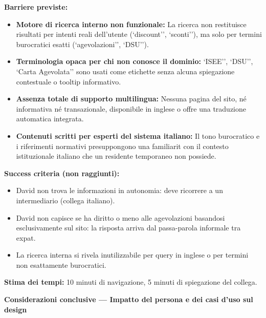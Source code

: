 \documentclass[11pt,a4paper]{article}
\begin{document}
\begin{tcolorbox}[colback=backgroundColor,colframe=borderColor,arc=2mm]
{    \textbf{Barriere previste:}
    \begin{itemize}
        \item \textbf{Motore di ricerca interno non funzionale:} La ricerca non restituisce risultati per intenti reali dell'utente (`discount'', `sconti''), ma solo per termini burocratici esatti (`agevolazioni'', `DSU'').
        \item \textbf{Terminologia opaca per chi non conosce il dominio:} `ISEE'', `DSU'', `Carta Agevolata'' sono usati come etichette senza alcuna spiegazione contestuale o tooltip informativo.
        \item \textbf{Assenza totale di supporto multilingua:} Nessuna pagina del sito, n\'e informativa n\'e transazionale, \e disponibile in inglese o offre una traduzione automatica integrata.
        \item \textbf{Contenuti scritti per esperti del sistema italiano:} Il tono burocratico e i riferimenti normativi presuppongono una familiarit\ con il contesto istituzionale italiano che un residente temporaneo non possiede.
    \end{itemize}

    \textbf{Success criteria (non raggiunti):}
    \begin{itemize}
        \item David non trova le informazioni in autonomia: deve ricorrere a un intermediario (collega italiano).
        \item David non capisce se ha diritto o meno alle agevolazioni basandosi esclusivamente sul sito: la risposta arriva dal passa-parola informale tra expat.
        \item La ricerca interna si rivela inutilizzabile per query in inglese o per termini non esattamente burocratici.
    \end{itemize}

    \textbf{Stima dei tempi:} 10 minuti di navigazione, 5 minuti di spiegazione del collega.
    }
\end{tcolorbox}
\newpage

% 

\begin{tcolorbox}[colback=primaryColor!10,colframe=primaryColor,arc=2mm]
    \textbf{Considerazioni conclusive --- Impatto del persona e dei casi d'uso sul design}
\end{tcolorbox}
\end{document}
